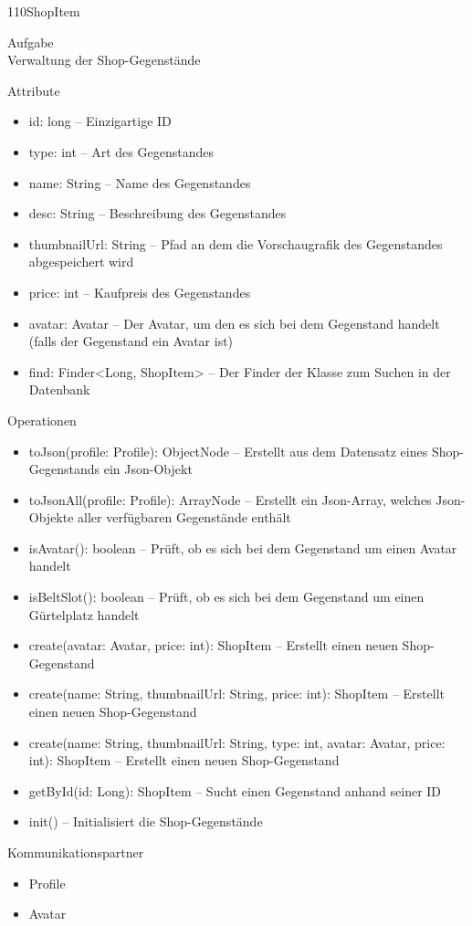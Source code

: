 \newpage
\begin{class}{110}{ShopItem}
\item[Aufgabe]~\\
Verwaltung der Shop-Gegenstände
\item[Attribute]~\\
\begin{itemize}
\item id: long -- Einzigartige ID
\item type: int -- Art des Gegenstandes
\item name: String -- Name des Gegenstandes
\item desc: String -- Beschreibung des Gegenstandes
\item thumbnailUrl: String -- Pfad an dem die Vorschaugrafik des Gegenstandes abgespeichert wird
\item price: int -- Kaufpreis des Gegenstandes
\item avatar: Avatar -- Der Avatar, um den es sich bei dem Gegenstand handelt (falls der Gegenstand ein Avatar ist)
\item find: Finder<Long, ShopItem> -- Der Finder der Klasse zum Suchen in der Datenbank
\end{itemize}
\item[Operationen]~\\
\begin{itemize}
\item toJson(profile: Profile): ObjectNode -- Erstellt aus dem Datensatz eines Shop-Gegenstands ein Json-Objekt
\item toJsonAll(profile: Profile): ArrayNode -- Erstellt ein Json-Array, welches Json-Objekte aller verfügbaren Gegenstände enthält
\item isAvatar(): boolean -- Prüft, ob es sich bei dem Gegenstand um einen Avatar handelt
\item isBeltSlot(): boolean -- Prüft, ob es sich bei dem Gegenstand um einen Gürtelplatz handelt
\item create(avatar: Avatar, price: int): ShopItem -- Erstellt einen neuen Shop-Gegenstand
\item create(name: String, thumbnailUrl: String, price: int): ShopItem -- Erstellt einen neuen Shop-Gegenstand
\item create(name: String, thumbnailUrl: String, type: int, avatar: Avatar, price: int): ShopItem -- Erstellt einen neuen Shop-Gegenstand
\item getById(id: Long): ShopItem -- Sucht einen Gegenstand anhand seiner ID
\item init() -- Initialisiert die Shop-Gegenstände
\end{itemize}
\item[Kommunikationspartner]~\\
\begin{itemize}
\item Profile
\item Avatar
\end{itemize}
\end{class}

